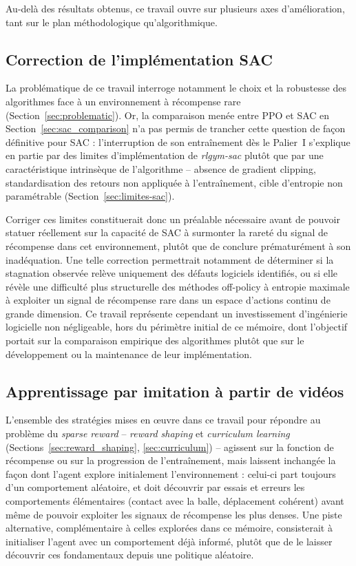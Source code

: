 Au-delà des résultats obtenus, ce travail ouvre sur plusieurs axes d'amélioration, tant sur le plan méthodologique qu'algorithmique.

\subsection{Correction de l'implémentation SAC}

La problématique de ce travail interroge notamment le choix et la robustesse des algorithmes face à un environnement à récompense rare (Section~\ref{sec:problematic}). Or, la comparaison menée entre PPO et SAC en Section~\ref{sec:sac_comparison} n'a pas permis de trancher cette question de façon définitive pour SAC : l'interruption de son entraînement dès le Palier~I 
s'explique en partie par des limites d'implémentation de \textit{rlgym-sac} plutôt que par une caractéristique intrinsèque de l'algorithme -- absence de gradient clipping, standardisation des retours non appliquée à l'entraînement, cible d'entropie non paramétrable (Section~\ref{sec:limites-sac}).

Corriger ces limites constituerait donc un préalable nécessaire avant de pouvoir statuer réellement sur la capacité de SAC à surmonter la rareté du signal de récompense dans cet environnement, plutôt que de conclure prématurément à son inadéquation. Une telle correction permettrait notamment de déterminer si la stagnation observée relève uniquement des défauts logiciels identifiés, ou si elle révèle une difficulté plus structurelle des méthodes off-policy à entropie maximale à exploiter un signal de récompense rare dans un espace d'actions continu de grande dimension. Ce travail représente cependant un investissement d'ingénierie logicielle non négligeable, hors du périmètre initial de ce mémoire, dont l'objectif portait sur la comparaison empirique des algorithmes plutôt que sur le développement ou la maintenance de leur implémentation.

\subsection{Apprentissage par imitation à partir de vidéos}


L'ensemble des stratégies mises en \oe uvre dans ce travail pour répondre au problème du \textit{sparse reward} -- \textit{reward shaping} et \textit{curriculum learning} (Sections~\ref{sec:reward_shaping}, \ref{sec:curriculum}) -- agissent sur la fonction de récompense ou sur la progression de l'entraînement, mais laissent inchangée la façon dont l'agent explore initialement l'environnement : celui-ci part toujours d'un comportement aléatoire, et doit découvrir par essais et erreurs les comportements élémentaires (contact avec la balle, déplacement cohérent) avant même de pouvoir exploiter les signaux de récompense les plus denses. Une piste alternative, complémentaire à celles explorées dans ce mémoire, consisterait à initialiser l'agent avec un comportement déjà informé, plutôt que de le laisser découvrir ces fondamentaux depuis une politique aléatoire.

